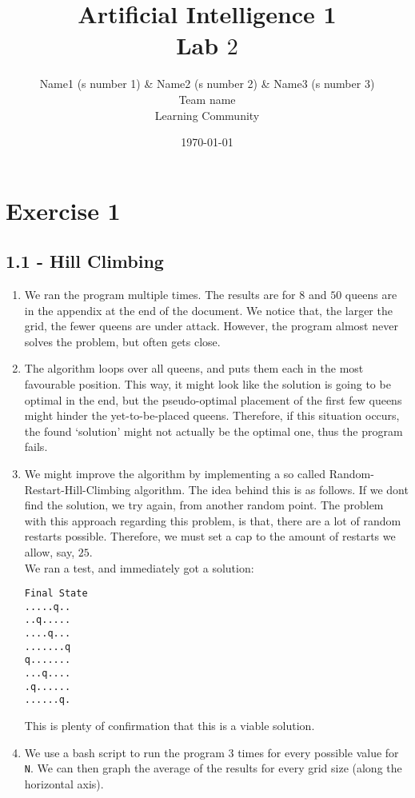 \documentclass{article}
\title{{\bf Artificial Intelligence 1} \\ Lab $2$}%
\author{
Name1 (s number 1) \& Name2 (s number 2) \& Name3 (s number 3) \\ 
Team name \\
Learning Community
} %
\date{\today}%
\begin{document}
\maketitle

\section*{Exercise 1}
\subsection*{1.1 - Hill Climbing}
\begin{enumerate}[1.]
\item We ran the program multiple times. The results are for $8$ and $50$ queens are in the appendix at the end of the document. We notice that, the larger the grid, the fewer queens are under attack. However, the program almost never solves the problem, but often gets close. 
\item The algorithm loops over all queens, and puts them each in the most favourable position. This way, it might look like the solution is going to be optimal in the end, but the pseudo-optimal placement of the first few queens might hinder the yet-to-be-placed queens. Therefore, if this situation occurs, the found `solution' might not actually be the optimal one, thus the program fails.
\item We might improve the algorithm by implementing a so called Random-Restart-Hill-Climbing algorithm. The idea behind this is as follows. If we dont find the solution, we try again, from another random point. The problem with this approach regarding this problem, is that, there are a lot of random restarts possible. Therefore, we must set a cap to the amount of restarts we allow, say, $25$.\\
We ran a test, and immediately got a solution:
\begin{verbatim}
Final State
.....q..
..q.....
....q...
.......q
q.......
...q....
.q......
......q.
\end{verbatim}
This is plenty of confirmation that this is a viable solution.
\item We use a bash script to run the program 3 times for every possible value for \verb|N|. We can then graph the average of the results for every grid size (along the horizontal axis).\\

\usetikzlibrary{calc}
\end{enumerate}
\end{document}

